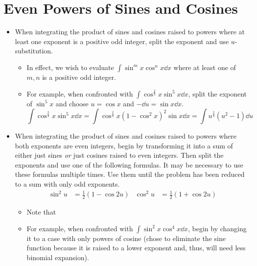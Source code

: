\documentclass[../main.tex]{subfiles}
\begin{document}
\section{Even Powers of Sines and Cosines}
\begin{itemize}
    \item When integrating the product of sines and cosines raised to powers where at least one exponent is a positive odd integer, split the exponent and use $u$-substitution.
    \begin{itemize}
        \item In effect, we wish to evaluate $\int\sin^mx\cos^nx\dd{x}$ where at least one of $m,n$ is a positive odd integer.
        \item For example, when confronted with $\int\cos^\frac{2}{3}x\sin^5x\dd{x}$, split the exponent of $\sin^5x$ and choose $u=\cos x$ and $-\dd u=\sin x\dd{x}$.
        \begin{equation*}
            \int\cos^\frac{2}{3}x\sin^5x\dd{x} = \int\cos^\frac{2}{3}x\left( 1-\cos^2x \right)^2\sin x\dd{x}
            = \int u^\frac{2}{3}\left( u^2-1 \right)\dd{u}
        \end{equation*}
    \end{itemize}
    \item When integrating the product of sines and cosines raised to powers where both exponents are even integers, begin by transforming it into a sum of either just sines \emph{or} just cosines raised to even integers. Then split the exponents and use one of the following formulas. It may be necessary to use these formulas multiple times. Use them until the problem has been reduced to a sum with only odd exponents.
    \begin{align*}
        \sin^2u &= \frac{1}{2}(1-\cos2u)&
        \cos^2u &= \frac{1}{2}(1+\cos2u)
    \end{align*}
    \begin{itemize}
        \item Note that 
        \item For example, when confronted with $\int\sin^2x\cos^4x\dd{x}$, begin by changing it to a case with only powers of cosine (chose to eliminate the sine function because it is raised to a lower exponent and, thus, will need less binomial expansion).
        \begin{align*}

\end{align*}
\end{itemize}
\end{itemize}
\end{document}
